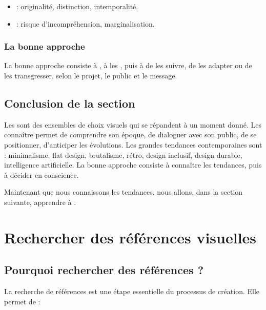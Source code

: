 \begin{itemize}
    \item {} : originalité, distinction, intemporalité.
    \item {} : risque d'incompréhension, marginalisation.
\end{itemize}

\subsubsection{La bonne approche}

La bonne approche consiste à , à les , puis à  de les suivre, de les adapter ou de les transgresser, selon le projet, le public et le message.

\subsection*{Conclusion de la section}

\begin{retenir}
Les  sont des ensembles de choix visuels qui se répandent à un moment donné. Les connaître permet de comprendre son époque, de dialoguer avec son public, de se positionner, d'anticiper les évolutions. Les grandes tendances contemporaines sont : minimalisme, flat design, brutalisme, rétro, design inclusif, design durable, intelligence artificielle. La bonne approche consiste à connaître les tendances, puis à décider en conscience.
\end{retenir}

Maintenant que nous connaissons les tendances, nous allons, dans la section suivante, apprendre à .

\section{Rechercher des références visuelles}

\subsection{Pourquoi rechercher des références ?}

La recherche de références est une étape essentielle du processus de création. Elle permet de :

